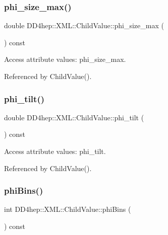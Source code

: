 \subsubsection{\texorpdfstring{phi\+\_\+size\+\_\+max()}{phi\_size\_max()}}
{\footnotesize\ttfamily double D\+D4hep\+::\+X\+M\+L\+::\+Child\+Value\+::phi\+\_\+size\+\_\+max (\begin{DoxyParamCaption}{ }\end{DoxyParamCaption}) const}



Access attribute values\+: phi\+\_\+size\+\_\+max. 



Referenced by Child\+Value().

\hypertarget{struct_d_d4hep_1_1_x_m_l_1_1_child_value_a8780736e20fa48e4852cc00601b925a5}{}\label{struct_d_d4hep_1_1_x_m_l_1_1_child_value_a8780736e20fa48e4852cc00601b925a5} 
\subsubsection{\texorpdfstring{phi\+\_\+tilt()}{phi\_tilt()}}
{\footnotesize\ttfamily double D\+D4hep\+::\+X\+M\+L\+::\+Child\+Value\+::phi\+\_\+tilt (\begin{DoxyParamCaption}{ }\end{DoxyParamCaption}) const}



Access attribute values\+: phi\+\_\+tilt. 



Referenced by Child\+Value().

\hypertarget{struct_d_d4hep_1_1_x_m_l_1_1_child_value_a989b00ddee95ed27e402928cd63117fe}{}\label{struct_d_d4hep_1_1_x_m_l_1_1_child_value_a989b00ddee95ed27e402928cd63117fe} 
\subsubsection{\texorpdfstring{phi\+Bins()}{phiBins()}}
{\footnotesize\ttfamily int D\+D4hep\+::\+X\+M\+L\+::\+Child\+Value\+::phi\+Bins (\begin{DoxyParamCaption}{ }\end{DoxyParamCaption}) const}



